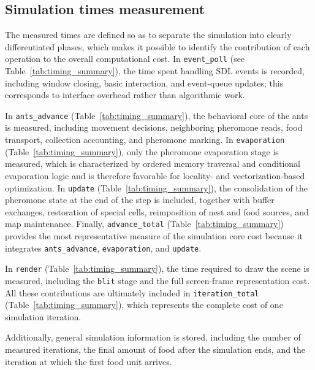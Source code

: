
\subsection{Simulation times measurement
}
The measured times are defined so as to separate the simulation into clearly differentiated phases, which makes it possible to identify the contribution of each operation to the overall computational cost. In \texttt{event\_poll} (see Table~\ref{tab:timing_summary}), the time spent handling SDL events is recorded, including window closing, basic interaction, and event-queue updates; this corresponds to interface overhead rather than algorithmic work.

In \texttt{ants\_advance} (Table~\ref{tab:timing_summary}), the behavioral core of the ants is measured, including movement decisions, neighboring pheromone reads, food transport, collection accounting, and pheromone marking. In \texttt{evaporation} (Table~\ref{tab:timing_summary}), only the pheromone evaporation stage is measured, which is characterized by ordered memory traversal and conditional evaporation logic and is therefore favorable for locality- and vectorization-based optimization. In \texttt{update} (Table~\ref{tab:timing_summary}), the consolidation of the pheromone state at the end of the step is included, together with buffer exchanges, restoration of special cells, reimposition of nest and food sources, and map maintenance. Finally, \texttt{advance\_total} (Table~\ref{tab:timing_summary}) provides the most representative measure of the simulation core cost because it integrates \texttt{ants\_advance}, \texttt{evaporation}, and \texttt{update}.

In \texttt{render} (Table~\ref{tab:timing_summary}), the time required to draw the scene is measured, including the \texttt{blit} stage and the full screen-frame representation cost. All these contributions are ultimately included in \texttt{iteration\_total} (Table~\ref{tab:timing_summary}), which represents the complete cost of one simulation iteration.

Additionally, general simulation information is stored, including the number of measured iterations, the final amount of food after the simulation ends, and the iteration at which the first food unit arrives.

